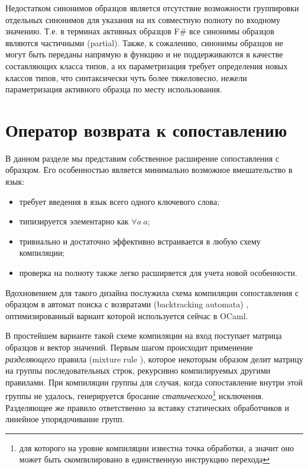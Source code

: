 Недостатком синонимов образцов является отсутствие возможности группировки отдельных синонимов для указания на их совместную полноту по входному значению. Т.е. в терминах активных образцов F\# все синонимы образцов являются частичными (partial). Также, к сожалению, синонимы образцов не могут быть переданы напрямую в функцию и не поддерживаются в качестве составляющих класса типов, а их параметризация требует определения новых классов типов, что синтаксически чуть более тяжеловесно, нежели параметризация активного образца по месту использования.

\section{Оператор возврата к сопоставлению} \label{sec:generalized_backtracking}

В данном разделе мы представим собственное расширение сопоставления с образцом. Его особенностью является минимально возможное вмешательство в язык:

\begin{itemize}
\item требует введения в язык всего одного ключевого слова;
\item типизируется элементарно как $\forall a\ a$;
\item тривиально и достаточно эффективно встраивается в любую схему компиляции;
\item проверка на полноту также легко расширяется для учета новой особенности.
\end{itemize}

Вдохновением для такого дизайна послужила схема компиляции сопоставления с образцом в автомат поиска с возвратами (backtracking automata) \cite{fessant2001optimizing,augustsson1985compiling}, оптимизированный вариант которой используется сейчас в OCaml.

В простейшем варианте такой схеме компиляции на вход поступает матрица образцов и вектор значений. Первым шагом происходит применение \textit{разделяющего} правила (mixture rule \cite{fessant2001optimizing}), которое некоторым образом делит матрицу на группы последовательных строк, рекурсивно компилируемых другими правилами. При компиляции группы для случая, когда сопоставление внутри этой группы не удалось, генерируется бросание \textit{статического}\footnote{для которого на уровне компиляции известна точка обработки, а значит оно может быть скомпилировано в единственную инструкцию перехода} исключения. Разделяющее же правило ответственно за вставку статических обработчиков и линейное упорядочивание групп.

